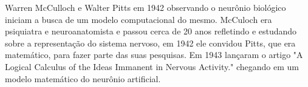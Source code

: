     
    
    Warren McCulloch e Walter Pitts em 1942 observando o neurônio biológico iniciam a busca de um modelo computacional do mesmo. McCuloch era psiquiatra e neuroanatomista e passou cerca de 20 anos refletindo e estudando sobre a representação do sistema nervoso, em 1942 ele convidou Pitts, que era matemático, para fazer parte das suas pesquisas. Em 1943 lançaram o artigo "A Logical Calculus of the Ideas Immanent in Nervous Activity." chegando em um modelo matemático do neurônio artificial. 
    
    \begin{figure}[H]
    \end{figure}
    
